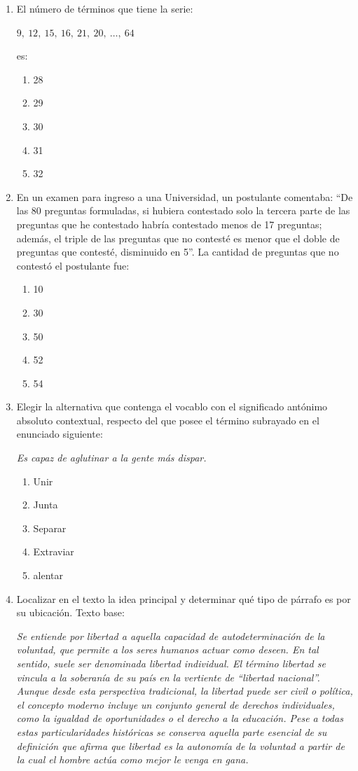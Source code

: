 \begin{enumerate}
	\item El número de términos que tiene la serie:
	
	$9,\ 12,\ 15,\ 16,\ 21,\ 20,\ \ldots,\ 64$
	
	es:
	
	\begin{enumerate}[label=\alph*)]
		\item 28
		\item 29
		\item 30
		\item 31
		\item 32
	\end{enumerate}
	
	\item En un examen para ingreso a una Universidad, un postulante comentaba: “De las 80 preguntas formuladas, si hubiera contestado solo la tercera parte de las preguntas que he contestado habría contestado menos de 17 preguntas; además, el triple de las preguntas que no contesté es menor que el doble de preguntas que contesté, disminuido en 5”. La cantidad de preguntas que no contestó el postulante fue:
	\begin{enumerate}[label=\alph*)]
		\item 10
		\item 30
		\item 50
		\item 52
		\item 54
	\end{enumerate}
	
	\item Elegir la alternativa que contenga el vocablo con el significado antónimo absoluto contextual, respecto del que posee el término subrayado en el enunciado siguiente:
	
	\textit{Es capaz de aglutinar a la gente más dispar.}
	
	\begin{enumerate}[label=\alph*)]
		\item Unir
		\item Junta
		\item Separar
		\item Extraviar
		\item alentar
	\end{enumerate}
	
	\item Localizar en el texto la idea principal y determinar qué tipo de párrafo es por su ubicación. Texto base:
	
	\textit{Se entiende por libertad a aquella capacidad de autodeterminación de la voluntad, que permite a los seres humanos actuar como deseen. En tal sentido, suele ser denominada libertad individual. El término libertad se vincula a la soberanía de su país en la vertiente de “libertad nacional”. Aunque desde esta perspectiva tradicional, la libertad puede ser civil o política, el concepto moderno incluye un conjunto general de derechos individuales, como la igualdad de oportunidades o el derecho a la educación. Pese a todas estas particularidades históricas se conserva aquella parte esencial de su definición que afirma que libertad es la autonomía de la voluntad a partir de la cual el hombre actúa como mejor le venga en gana.}
	

\end{enumerate}
